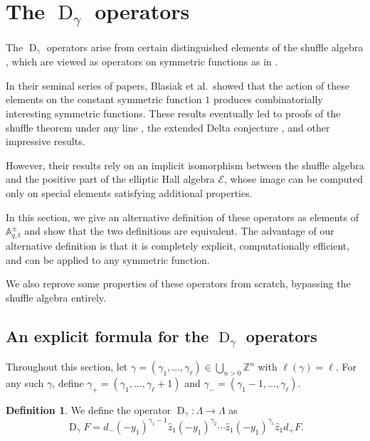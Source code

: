 \documentclass[reqno]{amsart}
\theoremstyle{plain}
\theoremstyle{definition}
\newtheorem{definition}[theorem]{Definition}
\theoremstyle{remark}
\DeclareMathOperator{\D}{D}
\newcommand{\A}{\mathbb{A}}%
\newcommand{\z}{\widehat{z}}
\newcommand{\<}{\langle}
\renewcommand{\>}{\rangle}
\begin{document}
\section{The \texorpdfstring{$\D_\gamma$}{Dgamma} operators}
\label{sec:Dgamma}

The $\D_\gamma$ operators arise from certain distinguished elements of the shuffle algebra \cite[Proposition~6.1]{Negut2014ShuffleAlgebra}, which are viewed as operators on symmetric functions as in \cite[Equation~(52)]{BHMPS2023ShuffleAnyLine}.

In their seminal series of papers, Blasiak et al.\ showed that the action of these elements on the constant symmetric function $1$ produces combinatorially interesting symmetric functions. These results eventually led to proofs of the shuffle theorem under any line \cite{BHMPS2023ShuffleAnyLine}, the extended Delta conjecture \cite{BHMPS2023ProofExtendedDelta}, and other impressive results.

However, their results rely on an implicit isomorphism between the shuffle algebra and the positive part of the elliptic Hall algebra $\mathcal{E}$, whose image can be computed only on special elements satisfying additional properties.

In this section, we give an alternative definition of these operators as elements of $\A_{q,t}^\pm$ and show that the two definitions are equivalent. The advantage of our alternative definition is that it is completely explicit, computationally efficient, and can be applied to any symmetric function.

We also reprove some properties of these operators from scratch, bypassing the shuffle algebra entirely.


\subsection{An explicit formula for the \texorpdfstring{$\D_\gamma$}{Dgamma} operators}

Throughout this section, let $\gamma = (\gamma_1, \dots, \gamma_\ell) \in \bigcup_{n > 0} \mathbb{Z}^n$ with $\ell(\gamma) = \ell$. For any such $\gamma$, define $\gamma_+ = (\gamma_1, \dots, \gamma_\ell + 1)$ and $\gamma_- = (\gamma_1 - 1, \dots, \gamma_\ell)$.

\begin{definition}
    \label{def:D_gamma}
    We define the operator $\D_\gamma \colon \Lambda \rightarrow \Lambda$ as \[ \D_\gamma F = d_- (-y_1)^{\gamma_1-1} \z_1 (-y_1)^{\gamma_2} \cdots \z_1 (-y_1)^{\gamma_\ell} \z_1 d_+ F. \] 
\end{definition}
\end{document}

